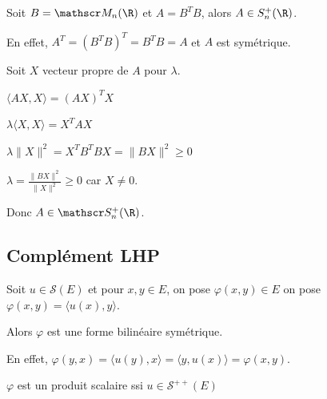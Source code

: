 \begin{exemple}
    Soit $B = \mathscr M_n(\R)$ et $A = B^T B$, alors 
    $A \in S_n^+(\R)$. 

    En effet, $A^T = (B^T B)^T = B^T B = A$ et $A$ est symétrique.

    Soit $X$ vecteur propre de $A$ pour $\lambda$. 

    $\langle AX, X \rangle = (AX)^T X$ 
    
    $\lambda \langle X, X \rangle = X^T A X$

    $\lambda \| X \|^2 = X^T B^T B X = \| BX \|^2 \geqslant 0$

    $\lambda = \frac{\|BX \|^2}{\| X \|^2} \geqslant 0$ car $X \neq 0$. 

    Donc $A \in \mathscr S_n^+(\R)$. 
\end{exemple}

\subsection{Complément LHP}

Soit $u \in \mathscr S(E)$ et pour $x, y \in E$, on pose 
$\varphi(x, y) \in E$ on pose $\varphi(x, y) = \langle u(x), y \rangle$.

Alors $\varphi$ est une forme bilinéaire symétrique. 

En effet, 
$\varphi(y, x) = \langle u(y), x \rangle = \langle y, u(x) \rangle = \varphi(x, y)$. 

$\varphi$ est un produit scalaire ssi $u \in \mathscr S^{++}(E) $ 


